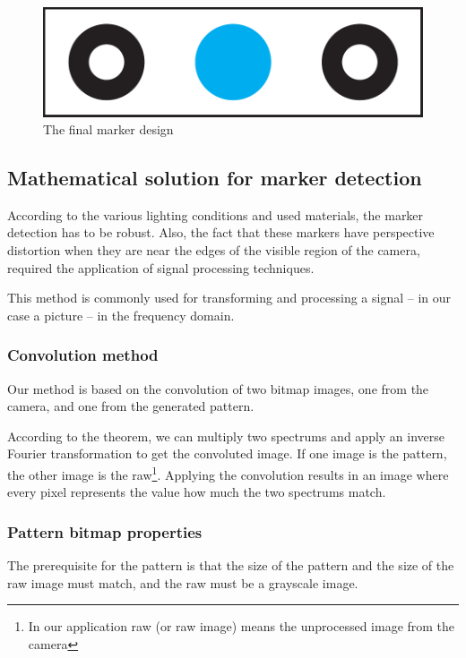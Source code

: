 \begin{figure}[h]
	\centering
	\includegraphics[width=0.5\linewidth]{include/figures/chapter_6/opencv_finalmarker}
	\caption{The final marker design}
	\label{fig:case_study:final_marker} 
\end{figure}

\subsection{Mathematical solution for marker detection}
\label{fig:case_study:opencv_math}


According to the various lighting conditions and used materials, the marker detection has to be robust. Also, the fact that these markers have perspective distortion when they are near the edges of the visible region of the camera, required the application of signal processing techniques.

This method is commonly used for transforming and processing a signal -- in our case a picture -- in the frequency domain.

\subsubsection{Convolution method}
\label{sec:case_study:convolution}

Our method is based on the convolution of two bitmap images, one from the camera, and one from the generated pattern.

According to the theorem, we can multiply two spectrums and apply an inverse Fourier transformation to get the convoluted image. If one image is the pattern, the other image is the raw\footnote{In our application raw (or raw image) means the unprocessed image from the camera}. Applying the convolution results in an image where every pixel represents the value how much the two spectrums match.

\subsubsection{Pattern bitmap properties}

The prerequisite for the pattern is that the size of the pattern and the size of the raw image must match, and the raw must be a grayscale image.

